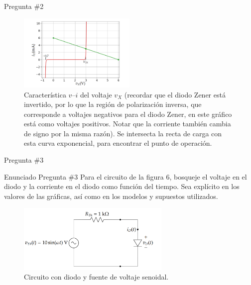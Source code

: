 \documentclass[
    10pt,
    aspectratio=169,
    xcolor={dvipsnames},
    spanish,
    ]{beamer}
\begin{document}
\begin{frame}{Pregunta \#2}
\begin{figure}[H]
  \centering
  \includegraphics[width=0.5\textwidth]{Auxiliar_4_9}
  \caption{Característica $v$--$i$ del voltaje $v_X$ (recordar que el diodo Zener está invertido, por lo que la región de polarización inversa, que corresponde a voltajes negativos para el diodo Zener, en este gráfico está como voltajes positivos. Notar que la corriente también cambia de signo por la misma razón). Se intersecta la recta de carga con esta curva exponencial, para encontrar el punto de operación.}
  \label{fig:iv-diodo}
\end{figure}
\end{frame}
\begin{frame}{Pregunta \#3}
  \footnotesize
  \begin{block}{Enunciado Pregunta \#3}
  Para el circuito de la figura 6, bosqueje el voltaje en el diodo y la corriente en el diodo como función del tiempo. Sea explícito en los valores de las gráficas, así como en los modelos y supuestos utilizados.
  \end{block}
\begin{figure}[H]
  \centering
\includegraphics[width=0.65\textwidth]{Auxiliar_4_12}
  \caption{Circuito con diodo y fuente de voltaje senoidal.}
  \label{fig:3}
\end{figure}
\end{frame}
\end{document}
